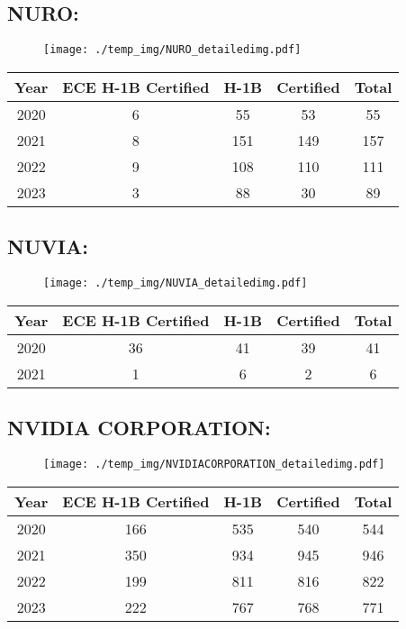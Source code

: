 \documentclass{article}%
\begin{document}
%
\newpage%
\subsection{NURO:}%
\label{subsec:NURO}%
\label{NUROdetailed}%


\begin{figure}[htbp]%
\centering%
\texttt{[image: ./temp\_img/NURO\_detailedimg.pdf]}%
\end{figure}

%
\begin{longtable}{c|c|c|c|c}%
\hline%
Year&ECE H{-}1B Certified&H{-}1B&Certified&Total\\%
\hline%
2020&6&55&53&55\\%
\hline%
2021&8&151&149&157\\%
\hline%
2022&9&108&110&111\\%
\hline%
2023&3&88&30&89\\%
\hline%
\end{longtable}

%
\newpage%
\subsection{NUVIA:}%
\label{subsec:NUVIA}%
\label{NUVIAdetailed}%


\begin{figure}[htbp]%
\centering%
\texttt{[image: ./temp\_img/NUVIA\_detailedimg.pdf]}%
\end{figure}

%
\begin{longtable}{c|c|c|c|c}%
\hline%
Year&ECE H{-}1B Certified&H{-}1B&Certified&Total\\%
\hline%
2020&36&41&39&41\\%
\hline%
2021&1&6&2&6\\%
\hline%
\end{longtable}

%
\newpage%
\subsection{NVIDIA CORPORATION:}%
\label{subsec:NVIDIACORPORATION}%
\label{NVIDIACORPORATIONdetailed}%


\begin{figure}[htbp]%
\centering%
\texttt{[image: ./temp\_img/NVIDIACORPORATION\_detailedimg.pdf]}%
\end{figure}

%
\begin{longtable}{c|c|c|c|c}%
\hline%
Year&ECE H{-}1B Certified&H{-}1B&Certified&Total\\%
\hline%
2020&166&535&540&544\\%
\hline%
2021&350&934&945&946\\%
\hline%
2022&199&811&816&822\\%
\hline%
2023&222&767&768&771\\%
\hline%
\end{longtable}
\end{document}
